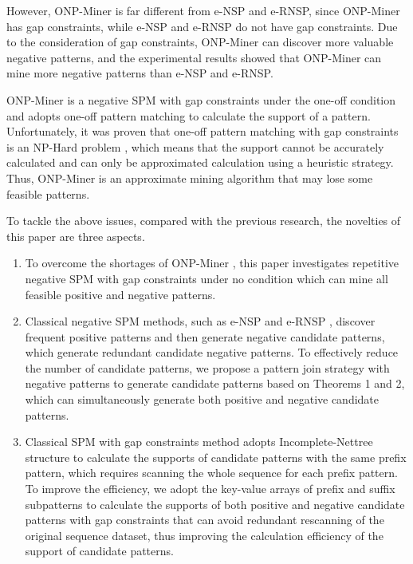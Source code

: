 However, ONP-Miner is far different from e-NSP and e-RNSP, since ONP-Miner \cite {onpminer} has gap constraints, while e-NSP \cite{41_Cao2016} and e-RNSP  \cite{43_Dong2020} do not have gap constraints. Due to the consideration of gap constraints, ONP-Miner can discover more valuable negative patterns, and the experimental results showed that ONP-Miner can mine more negative patterns than e-NSP and e-RNSP.

ONP-Miner is a negative SPM with gap constraints under the one-off condition and adopts one-off pattern matching to calculate the support of a pattern. Unfortunately, it was proven that one-off pattern matching with gap constraints is an NP-Hard problem \cite {28_Wu2021, oneoff2}, which means that the support cannot be accurately calculated and can only be approximated calculation using a heuristic strategy. Thus, ONP-Miner is an approximate mining algorithm that may lose some feasible patterns. 


{To tackle the above issues, compared with the previous research, the novelties of this paper are three aspects. }

\begin {enumerate}
\item { To overcome the shortages of ONP-Miner \cite {onpminer}, this paper investigates repetitive negative SPM with gap constraints under no condition which can mine all feasible positive and negative patterns.}

\item {Classical negative SPM methods, such as e-NSP \cite{41_Cao2016} and e-RNSP \cite{43_Dong2020}, discover frequent positive patterns and then generate negative candidate patterns, which generate redundant candidate negative patterns. To effectively reduce the number of candidate patterns, we propose a pattern join strategy with negative patterns to generate candidate patterns based on Theorems 1 and 2, which can simultaneously generate both positive and negative candidate patterns.}

\item { Classical SPM with gap constraints method \cite{32_Wu2014} adopts Incomplete-Nettree structure to calculate the supports of candidate patterns with the same prefix pattern, which requires scanning the whole sequence for each prefix pattern. To improve the efficiency, we adopt the key-value arrays of prefix and suffix subpatterns to calculate the supports of both positive and negative candidate patterns with gap constraints that can avoid redundant rescanning of the original sequence dataset, thus improving the calculation efficiency of the support of candidate patterns.}

\end {enumerate}